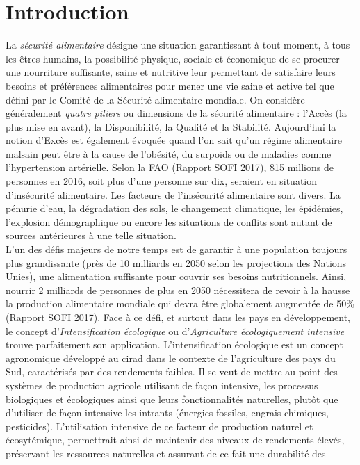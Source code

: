 \section{Introduction}

La \emph{sécurité alimentaire} désigne \og une situation garantissant à tout moment, à tous les êtres humains, la possibilité physique, sociale et économique 
de se procurer une nourriture suffisante, saine et nutritive leur permettant de satisfaire leurs besoins et préférences alimentaires pour mener une vie saine et active \fg{}
tel que défini par le Comité de la Sécurité alimentaire mondiale. On considère généralement \emph {quatre piliers} ou dimensions de la sécurité alimentaire : l'Accès (la plus mise 
en avant), la Disponibilité, la Qualité et la Stabilité. Aujourd'hui la notion d'Excès est également évoquée quand l'on sait qu'un régime alimentaire malsain peut être à la cause 
de l'obésité, du surpoids ou de maladies comme l'hypertension artérielle. Selon la FAO (Rapport SOFI 2017), 815 millions de personnes en 2016, soit plus d'une personne sur dix, 
seraient en situation d'insécurité alimentaire. Les facteurs de l'insécurité alimentaire sont divers. La pénurie d'eau, la dégradation des sols, le changement climatique, les épidémies, 
l'explosion démographique ou encore les situations de conflits sont autant de sources antérieures à une telle situation. \\L'un des défis majeurs de notre temps est de garantir à une 
population toujours plus grandissante (près de 10 milliards en 2050 selon les projections des Nations Unies), une alimentation suffisante pour couvrir ses besoins nutritionnels. 
Ainsi, nourrir 2 milliards de personnes de plus en 2050 nécessitera de revoir à la hausse la production alimentaire mondiale qui devra être globalement augmentée de 50\% (Rapport SOFI 
2017). Face à ce défi, et surtout dans les pays en développement, le concept \og d'\emph{Intensification écologique} ou d'\emph{Agriculture écologiquement intensive} \fg{} trouve 
parfaitement son application. L'intensification écologique est un concept agronomique développé au \acrshort{cirad} dans le contexte de l'agriculture des pays du Sud, caractérisés par des 
rendements faibles. Il se veut de mettre au point des systèmes de production agricole utilisant de façon intensive, les processus biologiques et écologiques ainsi que leurs 
fonctionnalités naturelles, plutôt que d'utiliser de façon intensive les intrants (énergies fossiles, engrais chimiques, pesticides). L'utilisation intensive de ce facteur de 
production naturel et écosytémique, permettrait ainsi de maintenir des niveaux de rendements élevés, préservant les ressources naturelles et assurant de ce fait une durabilité des
